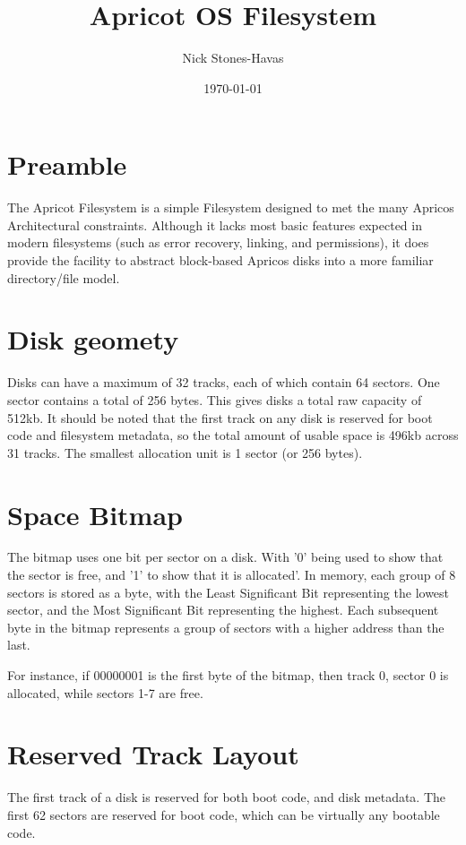 \documentclass{article}
\title{Apricot OS Filesystem}
\author{Nick Stones-Havas}
\date{\today}
\begin{document}
\maketitle
\thispagestyle{fancy}
\section{Preamble}
The Apricot Filesystem is a simple Filesystem designed to met the many Apricos Architectural constraints. Although it lacks most basic features expected in modern filesystems (such as error recovery, linking, and permissions), it does provide the facility to abstract block-based Apricos disks into a
more familiar directory/file model.

\section{Disk geomety}

Disks can have a maximum of 32 tracks, each of which contain 64 sectors. One sector contains a total of 256 bytes.
This gives disks a total raw capacity of 512kb. It should be noted that the first track on any disk is reserved for boot code
and filesystem metadata, so the total amount of usable space is 496kb across 31 tracks.
The smallest allocation unit is 1 sector (or 256 bytes).

\section{Space Bitmap}

The bitmap uses one bit per sector on a disk. With '0' being used to show that the sector is free, and '1' to show that it is allocated'.
In memory, each group of 8 sectors is stored as a byte, with the Least Significant Bit representing the lowest sector,
and the Most Significant Bit representing the highest. Each subsequent byte in the bitmap represents a group of sectors
with a higher address than the last.

For instance, if 00000001 is the first byte of the bitmap, then track 0, sector 0 is allocated, while sectors 1-7 are free.

\section{Reserved Track Layout}

The first track of a disk is reserved for both boot code, and disk metadata. The first 62 sectors are reserved for boot code, which can be virtually
any bootable code.
\end{document}
